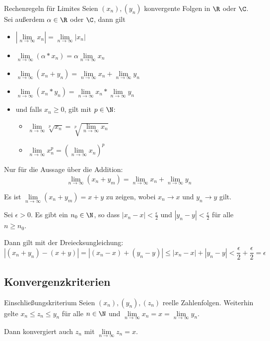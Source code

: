 \begin{satz}{Rechenregeln für Limites}
	Seien $(x_n), (y_n)$ konvergente Folgen in $\R$ oder $\C$. Sei außerdem $\alpha\in\R$ oder $\C$, dann gilt

	\begin{itemize}
		\item $\left|\lim\limits_{n\to\infty}x_n\right|=\lim\limits_{n\to\infty}|x_n|$
		\item $\lim\limits_{n\to\infty}(\alpha * x_n) = \alpha \lim\limits_{n\to\infty}x_n$
		\item $\lim\limits_{n\to\infty}(x_n+y_n)=\lim\limits_{n\to\infty}x_n+\lim\limits_{n\to\infty}y_n$
		\item $\lim\limits_{n\to\infty}(x_n*y_n)=\lim\limits_{n\to\infty}x_n*\lim\limits_{n\to\infty}y_n$
		\item und falls $x_n\geq 0$, gilt mit $p\in\N$:
		\begin{itemize}
			\item $ \lim\limits_{n\to\infty}\sqrt[p]{x_n}=\sqrt[p]{\lim\limits_{n\to\infty}x_n}$
			\item $\lim\limits_{n\to\infty}x_n^p = \left(\lim\limits_{n\to\infty}x_n\right)^p$
		\end{itemize}
	\end{itemize}
\end{satz}
\beweis
Nur für die Aussage über die Addition:
$$\lim\limits_{n\to\infty}(x_n+y_m)=\lim\limits_{n\to\infty}x_n+\lim\limits_{n\to\infty}y_n$$

Es ist $\lim\limits_{n\to\infty}(x_n+y_m) = x+y$ zu zeigen, wobei $x_n\to x$ und $y_n\to y$ gilt.

Sei $\epsilon>0$. Es gibt ein $n_0\in\N$, so dass $|x_n-x|<\frac\epsilon2$ und $|y_n-y|<\frac\epsilon2$ für alle $n\geq n_0$.

Dann gilt mit der Dreiecksungleichung: $$\left|(x_n+y_n)-(x+y)\right|=\left|(x_n-x)+(y_n-y)\right|\leq |x_n-x|+|y_n-y|<\frac\epsilon2+\frac\epsilon2=\epsilon$$


\subsection{Konvergenzkriterien}
\begin{satz}{Einschließungskriterium}
	Seien $(x_n), (y_n), (z_n)$ reelle Zahlenfolgen. Weiterhin gelte $x_n\leq z_n\leq y_n$ für alle $n\in\N$ und $\lim\limits_{n\to\infty} x_n=x=\lim\limits_{n\to\infty} y_n$.

	Dann konvergiert auch $z_n$ mit $\lim\limits_{n\to\infty} z_n = x$.
\end{satz}
\beweis

